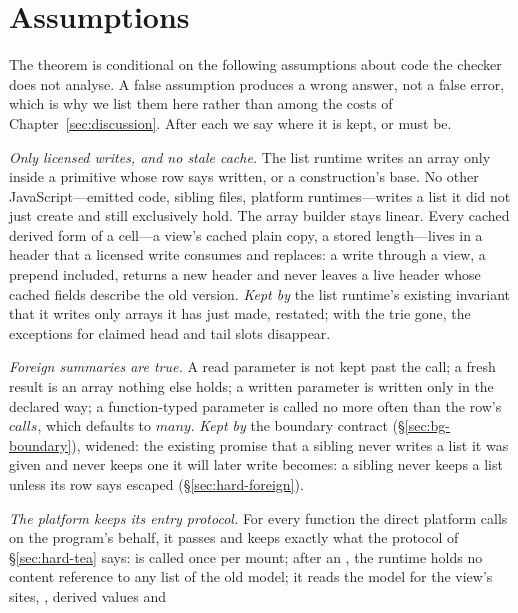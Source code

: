 \section{Assumptions}
\label{sec:soundness-assumptions}

The theorem is conditional on the following assumptions about code the checker does not analyse. A
false assumption produces a wrong answer, not a false error, which is why we list them here rather
than among the costs of Chapter~\ref{sec:discussion}. After each we say where it is kept, or must be.

\begin{description}[leftmargin=2.2em,style=sameline,font=\normalfont\bfseries]
\item[A1] \emph{Only licensed writes, and no stale cache.} The list runtime writes an array only inside
a primitive whose row says written, or a construction's base. No other JavaScript---emitted code, sibling
files, platform runtimes---writes a list it did not just create and still exclusively hold. The array
builder stays linear. Every cached derived form of a cell---a view's cached plain copy, a stored
length---lives in a header that a licensed write consumes and replaces: a write through a view, a
prepend included, returns a new header and never leaves a live header whose cached fields
describe the old version. \emph{Kept by} the list runtime's existing invariant that it writes only
arrays it has just made, restated; with the trie gone, the exceptions for claimed head and tail slots
disappear.
\item[A2] \emph{Foreign summaries are true.} A read parameter is not kept past the call; a fresh result
is an array nothing else holds; a written parameter is written only in the declared way; a function-typed
parameter is called no more often than the row's $\mathit{calls}$, which defaults to $\mathit{many}$.
\emph{Kept by} the boundary contract (\S\ref{sec:bg-boundary}), widened: the existing promise that a
sibling never writes a list it was given and never keeps one it will later write becomes: a sibling never
keeps a list unless its row says escaped (\S\ref{sec:hard-foreign}).
\item[A3] \emph{The platform keeps its entry protocol.} For every function the direct platform calls on
the program's behalf, it passes and keeps exactly what the protocol of \S\ref{sec:hard-tea} says:
 is called once per mount; after an , the runtime holds no content reference to
any list of the old model; it reads the model for the view's sites, , derived values and

\end{description}
